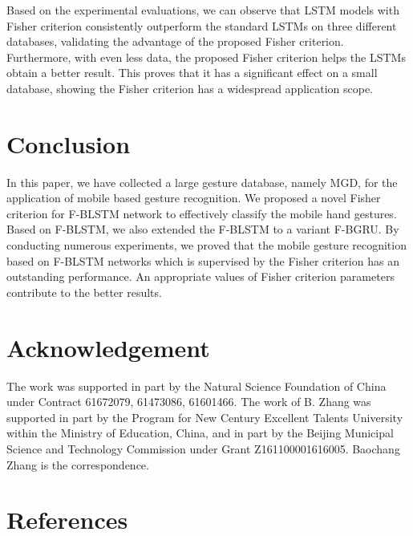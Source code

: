 \documentclass[review]{elsarticle}
\begin{document}
Based on the experimental evaluations, we can observe that LSTM models with Fisher criterion consistently outperform the standard LSTMs on three different databases, validating the advantage of the proposed Fisher criterion. Furthermore, with even less data, the proposed Fisher criterion helps the LSTMs obtain a better result. This proves that it has a significant effect on a small database, showing the Fisher criterion has a widespread application scope.

\section{Conclusion}\label{sec:conclusion}
{In this paper, we have collected a large gesture database, namely MGD, for the application of mobile based gesture recognition. We proposed a novel Fisher criterion for F-BLSTM network to effectively classify the mobile hand gestures. Based on F-BLSTM, we also extended the F-BLSTM to a variant F-BGRU. By conducting numerous experiments, we proved that the mobile gesture recognition based on F-BLSTM networks which is supervised by the Fisher criterion has an outstanding performance. An appropriate values of Fisher criterion parameters contribute to the better results.}
\section*{Acknowledgement}
The work was supported in part by the Natural Science Foundation of China under Contract 61672079, 61473086, 61601466. The work of B. Zhang was supported in part by the Program for New Century Excellent Talents University within the Ministry of Education, China, and in part by the Beijing Municipal Science and Technology Commission under Grant Z161100001616005. Baochang Zhang is the correspondence.
\section*{References}

\end{document}
